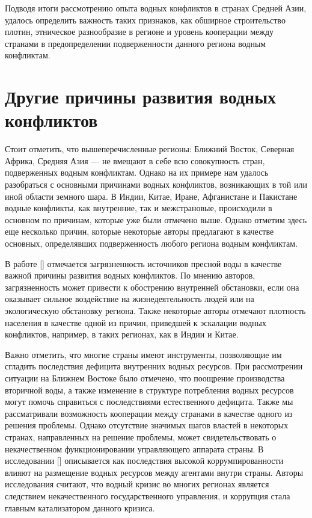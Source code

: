 \documentclass[a4paper, 12pt]{article}
\theoremstyle{plain} %
\theoremstyle{definition} %
\theoremstyle{remark} %
\begin{document}
Подводя итоги рассмотрению опыта водных конфликтов в странах Средней Азии, удалось определить важность таких признаков, как обширное строительство плотин, этническое разнообразие в регионе и уровень кооперации между странами в предопределении подверженности данного региона водным конфликтам.
\section{Другие причины развития водных конфликтов}
Стоит отметить, что вышеперечисленные регионы: Ближний Восток, Северная Африка, Средняя Азия --- не вмещают в себе всю совокупность стран, подверженных водным конфликтам. Однако на их примере нам удалось разобраться с основными причинами водных конфликтов, возникающих в той или иной области земного шара. В Индии, Китае, Иране, Афганистане и Пакистане водные конфликты, как внутренние, так и межстрановые, происходили в основном по причинам, которые уже были отмечено выше. Однако отметим здесь еще несколько причин, которые некоторые авторы предлагают в качестве основных, определявших подверженность любого региона водным конфликтам. 

В работе [\cite{wolf2005}] отмечается загрязненность источников пресной воды в качестве важной причины развития водных конфликтов. По мнению авторов, загрязненность может привести к обострению внутренней обстановки, если она оказывает сильное воздействие на жизнедеятельность людей или на экологическую обстановку региона. Также некоторые авторы отмечают плотность населения в качестве одной из причин, приведшей к эскалации водных конфликтов, например, в таких регионах, как в Индии и Китае.

Важно отметить, что многие страны имеют инструменты, позволяющие им сгладить последствия дефицита внутренних водных ресурсов. При рассмотрении ситуации на Ближнем Востоке было отмечено, что поощрение производства вторичной воды, а также изменение в структуре потребления водных ресурсов могут помочь справиться с последствиями естественного дефицита. Также мы рассматривали возможность кооперации между странами в качестве одного из решения проблемы. Однако отсутствие значимых шагов властей в некоторых странах, направленных на решение проблемы, может свидетельствовать о некачественном функционировании управляющего аппарата страны. В исследовании [\cite{corruption}] описывается как последствия высокой коррумпированности влияют на размещение водных ресурсов между агентами внутри страны. Авторы исследования считают, что водный кризис во многих регионах является следствием некачественного государственного управления, и коррупция стала главным катализатором данного кризиса.
\end{document}
